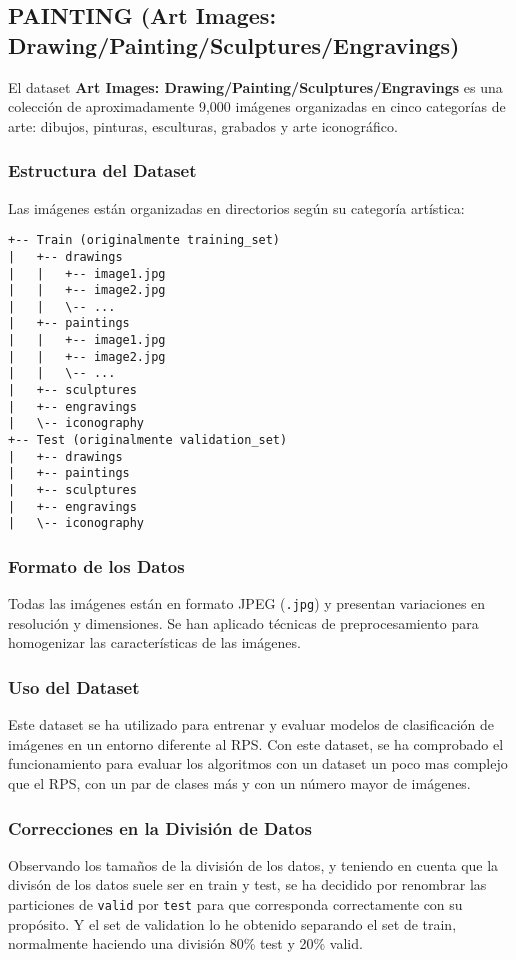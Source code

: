 \subsection{PAINTING (Art Images: Drawing/Painting/Sculptures/Engravings)}\label{subsec:painting}
El dataset \textbf{Art Images: Drawing/Painting/Sculptures/Engravings} es una colección de aproximadamente 9,000
imágenes organizadas en cinco categorías de arte: dibujos, pinturas, esculturas, grabados y arte iconográfico.

\subsubsection{Estructura del Dataset}
Las imágenes están organizadas en directorios según su categoría artística:
\begin{verbatim}
+-- Train (originalmente training_set)
|   +-- drawings
|   |   +-- image1.jpg
|   |   +-- image2.jpg
|   |   \-- ...
|   +-- paintings
|   |   +-- image1.jpg
|   |   +-- image2.jpg
|   |   \-- ...
|   +-- sculptures
|   +-- engravings
|   \-- iconography
+-- Test (originalmente validation_set)
|   +-- drawings
|   +-- paintings
|   +-- sculptures
|   +-- engravings
|   \-- iconography
\end{verbatim}

\subsubsection{Formato de los Datos}
Todas las imágenes están en formato JPEG (\texttt{.jpg}) y presentan variaciones en resolución y dimensiones.
Se han aplicado técnicas de preprocesamiento para homogenizar las características de las imágenes.

\subsubsection{Uso del Dataset}
Este dataset se ha utilizado para entrenar y evaluar modelos de clasificación de imágenes en un entorno diferente al
RPS\@.
Con este dataset, se ha comprobado el funcionamiento para evaluar los algoritmos con un dataset un poco mas complejo
que el RPS, con un par de clases más y con un número mayor de imágenes.

\subsubsection{Correcciones en la División de Datos}
Observando los tamaños de la división de los datos, y teniendo en cuenta que la divisón de los datos suele ser en train
y test, se ha decidido por renombrar las particiones de \texttt{valid} por \texttt{test} para que corresponda
correctamente con su propósito.
Y el set de validation lo he obtenido separando el set de train, normalmente haciendo una división 80\% test y 20\%
valid.

